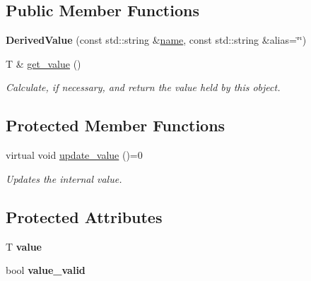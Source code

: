 \subsection*{Public Member Functions}
\begin{DoxyCompactItemize}
\item 
\hypertarget{classfv_1_1DerivedValue_a00219a17112600afdc060d67d6f95b21}{}\label{classfv_1_1DerivedValue_a00219a17112600afdc060d67d6f95b21} 
{\bfseries Derived\+Value} (const std\+::string \&\hyperlink{classfv_1_1GenValue_a610f89ee441eaad4c9e78f74d6bde93b}{name}, const std\+::string \&alias=\char`\"{}\char`\"{})
\item 
\hypertarget{classfv_1_1DerivedValue_a39970158aa8f6eb062a28037df6e2128}{}\label{classfv_1_1DerivedValue_a39970158aa8f6eb062a28037df6e2128} 
T \& \hyperlink{classfv_1_1DerivedValue_a39970158aa8f6eb062a28037df6e2128}{get\+\_\+value} ()
\begin{DoxyCompactList}\small\item\em Calculate, if necessary, and return the value held by this object. \end{DoxyCompactList}\end{DoxyCompactItemize}
\subsection*{Protected Member Functions}
\begin{DoxyCompactItemize}
\item 
virtual void \hyperlink{classfv_1_1DerivedValue_ae59e80a98eb74b95d8961bfe12ee5ec2}{update\+\_\+value} ()=0
\begin{DoxyCompactList}\small\item\em Updates the internal value. \end{DoxyCompactList}\end{DoxyCompactItemize}
\subsection*{Protected Attributes}
\begin{DoxyCompactItemize}
\item 
\hypertarget{classfv_1_1DerivedValue_aeb7ff5d17ad44b2040fc9930bbcc2c7a}{}\label{classfv_1_1DerivedValue_aeb7ff5d17ad44b2040fc9930bbcc2c7a} 
T {\bfseries value}
\item 
\hypertarget{classfv_1_1DerivedValue_aafa55adbb38dc7fe210ea15e920515dc}{}\label{classfv_1_1DerivedValue_aafa55adbb38dc7fe210ea15e920515dc} 
bool {\bfseries value\+\_\+valid}
\end{DoxyCompactItemize}
